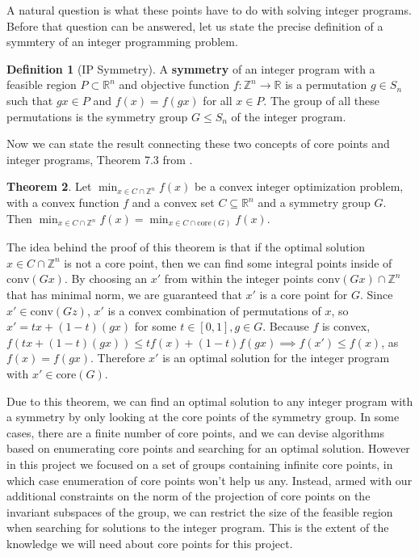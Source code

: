 \documentclass[11pt]{article} %
\theoremstyle{definition}
\newtheorem{theorem}{Theorem}[section]
\newtheorem{definition}[theorem]{Definition}
\theoremstyle{remark}
\newcommand{\ZZ}{\mathbb{Z}}
\newcommand{\RR}{\mathbb{R}}
\begin{document}
A natural question is what these points have to do with solving integer programs. Before that question can be answered, let us state the precise definition of a symmtery of an integer programming problem. 

\begin{definition}[IP Symmetry]
A \textbf{symmetry} of an integer program with a feasible region $P \subset \RR^n$ and objective function $f : \ZZ^n \rightarrow \RR$ is a permutation $g \in S_n$ such that $gx \in P$ and $f(x) = f(gx)$ for all $x \in P$. The group of all these permutations is the symmetry group $G \leq S_n$ of the integer program.
\end{definition}

Now we can state the result connecting these two concepts of core points and integer programs, Theorem 7.3 from \cite{rehn}.

\begin{theorem}
Let $\min_{x \in C \cap \ZZ^n} f(x)$ be a convex integer optimization problem, with a convex function $f$ and a convex set $C \subseteq \mathbb{R}^n$ and a symmetry group $G$. Then $\min_{x \in C \cap \ZZ^n} f(x) = \min_{x \in C \cap \textrm{core}(G)} f(x)$.
\end{theorem}

The idea behind the proof of this theorem is that if the optimal solution $x \in C \cap \ZZ^n$ is not a core point, then we can find some integral points inside of $\textrm{conv}(Gx)$. By choosing an $x'$ from within the integer points $\textrm{conv}(Gx) \cap \ZZ^n$ that has minimal norm, we are guaranteed that $x'$ is a core point for $G$. Since $x' \in \textrm{conv}(Gz)$, $x'$ is a convex combination of permutations of $x$, so $x' = tx + (1-t)(gx)$ for some $t \in [0,1], g \in G$. Because $f$ is convex, $f(tx + (1-t)(gx)) \leq tf(x) + (1-t)f(gx) \implies f(x') \leq f(x)$, as $f(x) = f(gx)$. Therefore $x'$ is an optimal solution for the integer program with $x' \in \textrm{core}(G)$.

Due to this theorem, we can find an optimal solution to any integer program with a symmetry by only looking at the core points of the symmetry group. In some cases, there are a finite number of core points, and we can devise algorithms based on enumerating core points and searching for an optimal solution. However in this project we focused on a set of groups containing infinite core points, in which case enumeration of core points won't help us any. Instead, armed with our additional constraints on the norm of the projection of core points on the invariant subspaces of the group, we can restrict the size of the feasible region when searching for solutions to the integer program. This is the extent of the knowledge we will need about core points for this project.
\end{document}
